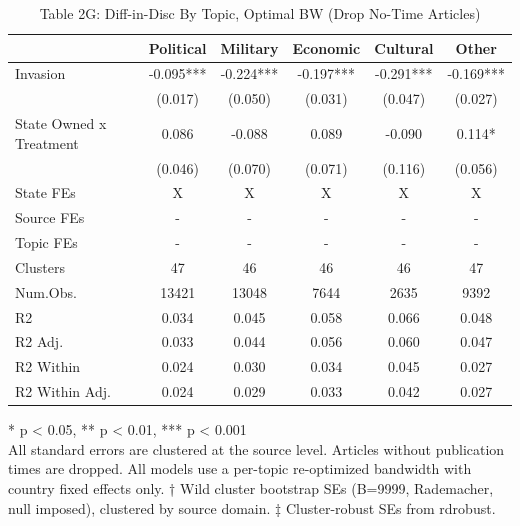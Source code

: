 \begin{table}[!t]
\caption{Table 2G: Diff-in-Disc By Topic, Optimal BW (Drop No-Time Articles)} 
\fontsize{12.0pt}{14.4pt}\selectfont
\begin{tabular*}{\linewidth}{@{\extracolsep{\fill}}lccccc}
\toprule
  & Political & Military & Economic & Cultural & Other \\ 
\midrule\addlinespace[2.5pt]
Invasion & -0.095*** & -0.224*** & -0.197*** & -0.291*** & -0.169*** \\ 
 & (0.017) & (0.050) & (0.031) & (0.047) & (0.027) \\ 
State Owned x Treatment & 0.086 & -0.088 & 0.089 & -0.090 & 0.114* \\ 
{} & {(0.046)} & {(0.070)} & {(0.071)} & {(0.116)} & {(0.056)} \\ 
State FEs & X & X & X & X & X \\ 
Source FEs & - & - & - & - & - \\ 
Topic FEs & - & - & - & - & - \\ 
Clusters & 47 & 46 & 46 & 46 & 47 \\ 
Num.Obs. & 13421 & 13048 & 7644 & 2635 & 9392 \\ 
R2 & 0.034 & 0.045 & 0.058 & 0.066 & 0.048 \\ 
R2 Adj. & 0.033 & 0.044 & 0.056 & 0.060 & 0.047 \\ 
R2 Within & 0.024 & 0.030 & 0.034 & 0.045 & 0.027 \\ 
R2 Within Adj. & 0.024 & 0.029 & 0.033 & 0.042 & 0.027 \\ 
\bottomrule
\end{tabular*}
\begin{minipage}{\linewidth}
* p < 0.05, ** p < 0.01, *** p < 0.001\\
All standard errors are clustered at the source level. Articles without
publication times are dropped. All models use a per-topic re-optimized
bandwidth with country fixed effects only. † Wild cluster bootstrap SEs (B=9999,
Rademacher, null imposed), clustered by source domain. ‡ Cluster-robust SEs from
rdrobust.\\
\end{minipage}
\end{table}

